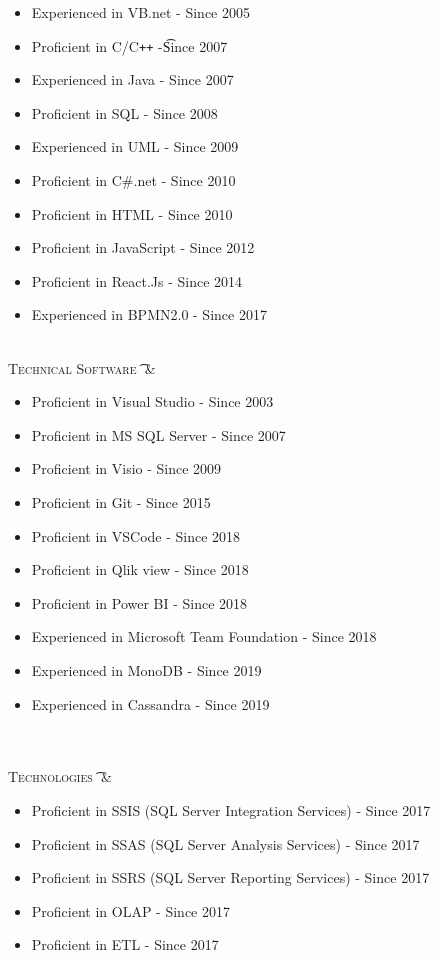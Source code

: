 \documentclass[10pt,a4paper,sans]{moderncv} %
\begin{document}
\begin{tabular}{}
    {
        \begin{itemize}
            \item Experienced in VB.net - Since 2005
            \item Proficient in C/C\texttt{++} -\t Since 2007
            \item Experienced in Java - Since 2007
            \item Proficient in SQL - Since 2008
            \item Experienced in UML - Since 2009
            \item Proficient in C\#.net - Since 2010 
            \item Proficient in HTML - Since 2010
            \item Proficient in JavaScript - Since 2012
            \item Proficient in React.Js - Since 2014
            \item Experienced in BPMN2.0 - Since 2017
        \end{itemize}
    }{}{}{}{}
 \\

\textsc{Technical Software \t} & \begin{itemize}
  \item Proficient in Visual Studio - Since 2003
  \item Proficient in MS SQL Server - Since 2007
  \item Proficient in Visio - Since 2009
  \item Proficient in Git - Since 2015
  \item Proficient in VSCode - Since 2018
  \item Proficient in Qlik view - Since 2018
  \item Proficient in Power BI - Since 2018
  \item Experienced in Microsoft Team Foundation - Since 2018
  \item Experienced in MonoDB - Since 2019
  \item Experienced in Cassandra - Since 2019
\end{itemize}\\
 \\

\textsc{Technologies \t} & \begin{itemize}
  \item Proficient in SSIS (SQL Server Integration Services)  - Since 2017
  \item Proficient in SSAS (SQL Server Analysis Services)  - Since 2017
  \item Proficient in SSRS (SQL Server Reporting Services)  - Since 2017
  \item Proficient in OLAP - Since 2017
  \item Proficient in ETL - Since 2017
\end{itemize}\\
 \\
\end{tabular}
\end{document}
